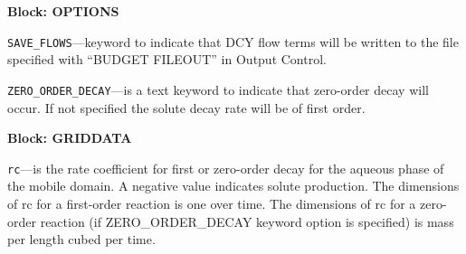 
\item \textbf{Block: OPTIONS}

\begin{description}
\item \texttt{SAVE\_FLOWS}---keyword to indicate that DCY flow terms will be written to the file specified with ``BUDGET FILEOUT'' in Output Control.

\item \texttt{ZERO\_ORDER\_DECAY}---is a text keyword to indicate that zero-order decay will occur.  If not specified the solute decay rate will be of first order.

\end{description}
\item \textbf{Block: GRIDDATA}

\begin{description}
\item \texttt{rc}---is the rate coefficient for first or zero-order decay for the aqueous phase of the mobile domain.  A negative value indicates solute production.  The dimensions of rc for a first-order reaction is one over time.  The dimensions of rc for a zero-order reaction (if ZERO_ORDER_DECAY keyword option is specified) is mass per length cubed per time.

\end{description}

